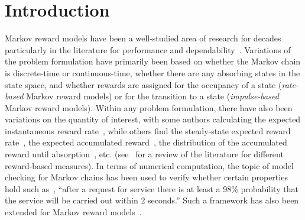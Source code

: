 \section{Introduction}

Markov reward models have been a well-studied area of research for decades~\cite{howard1971dynamicv2} particularly in the literature for performance and dependability~\cite{Trivedi93, Muppala96, Blake1988,GayKetelsen1979,Beaudry78}.  Variations of the problem formulation have primarily been based on whether the Markov chain is discrete-time or continuous-time, whether there are any absorbing states in the state space, and whether rewards are assigned for the occupancy of a state (\emph{rate-based} Markov reward models) or for the transition to a state (\emph{impulse-based} Markov reward models).  Within any problem formulation, there have also been variations on the quantity of interest, with some authors calculating the expected instantaneous reward rate~\cite{Blake1988}, while others find the steady-state expected reward rate~\cite{GayKetelsen1979}, the expected accumulated reward~\cite{Blake1988}, the distribution of the accumulated reward until absorption~\cite{Beaudry78}, etc. (see~\cite{Trivedi93} for a review of the literature for different reward-based measures).  In terms of numerical computation, the topic of model checking for Markov chains has been used to verify whether certain properties hold such as~\cite{HanssonJonsson94}, ``after a request for service there is at least a 98\% probability that the service will be carried out within 2 seconds.''  Such a framework has also been extended for Markov reward models~\cite{KKZ05}.


